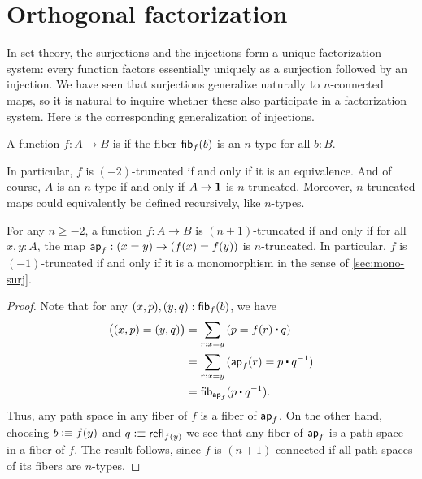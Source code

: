 \section{Orthogonal factorization}
\label{sec:image-factorization}

In set theory, the surjections and the injections form a unique factorization system: every function factors essentially uniquely as a surjection followed by an injection.
We have seen that surjections generalize naturally to $n$-connected maps, so it is natural to inquire whether these also participate in a factorization system.
Here is the corresponding generalization of injections.

\begin{defn}
  A function $f:A\to B$ is  if the fiber ${\mathsf{fib}}_{f}(b)$ is an $n$-type for all $b:B$.
\end{defn}

In particular, $f$ is $(-2)$-truncated if and only if it is an equivalence.
And of course, $A$ is an $n$-type if and only if $A\to\mathbf{1}$ is $n$-truncated.
Moreover, $n$-truncated maps could equivalently be defined recursively, like $n$-types.

\begin{lem}\label{thm:modal-mono}
  For any $n\ge -2$, a function $f:A\to B$ is $(n+1)$-truncated if and only if for all $x,y:A$, the map $\mathsf{ap}_{f}:(x=y) \to (f(x)=f(y))$ is $n$-truncated.
  In particular, $f$ is $(-1)$-truncated if and only if it is a monomorphism in the sense of \autoref{sec:mono-surj}.
\end{lem}
\begin{proof}
  Note that for any $(x,p),(y,q):{\mathsf{fib}}_{f}(b)$, we have
  \begin{align*}
    \big((x,p) = (y,q)\big)
    &= \sm{r:x=y} (p = f(r)\ct q)\\
    &= \sm{r:x=y} (\apfunc f (r) = p\ct \opp q)\\
    &= \hfib{\apfunc{f}}{p\ct \opp q}.
  \end{align*}
  Thus, any path space in any fiber of $f$ is a fiber of $\mathsf{ap}_{f}$.
  On the other hand, choosing $b\vcentcolon\equiv f(y)$ and $q\vcentcolon\equiv \mathsf{refl}_{f(y)}$ we see that any fiber of $\mathsf{ap}_{f}$ is a path space in a fiber of $f$.
  The result follows, since $f$ is $(n+1)$-connected if all path spaces of its fibers are $n$-types.
\end{proof}


